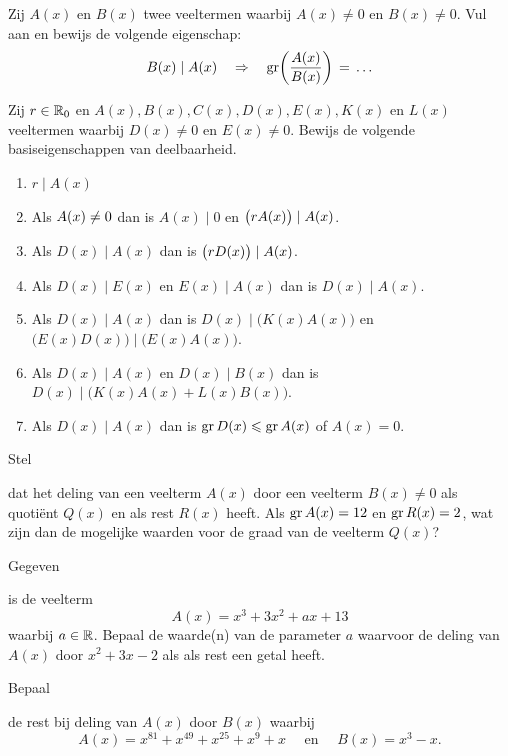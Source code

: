 \documentclass{ximera}
\begin{document}
\begin{Uitbreiding}
\begin{exercise} 
Zij $A(x)$ en $B(x)$ twee veeltermen waarbij $A(x) \neq 0$ en $B(x) \neq 0$. Vul aan en bewijs de volgende eigenschap:
\[
B(x) \mid A(x) \quad \Rightarrow \quad \operatorname{gr}\biggl(\frac{A(x)}{B(x)}\biggr) 
\, = \, \ldots
\]
\end{exercise} 

\begin{exercise} 
Zij $r \in \mathbb{R}_0$ en $A(x), B(x), C(x), D(x), E(x), K(x)$ en $L(x)$ veeltermen waarbij $D(x) \neq 0$ en $E(x) \neq 0$. Bewijs de volgende basiseigenschappen van deelbaarheid. 
\begin{enumerate}
\item
$r \mid A(x)$
\item
Als $\displaystyle A(x)  \neq 0$ dan is $A(x) \mid 0$ en $\displaystyle \bigl(rA(x)\bigr) \mid A(x)$.
\item
Als $D(x) \mid A(x)$ dan is $\displaystyle \bigl(rD(x)\bigr) \mid A(x)$.
\item
Als $D(x) \mid E(x)$ en $E(x) \mid A(x)$ dan is $D(x) \mid A(x)$. 
\item
Als $D(x) \mid A(x)$ dan is $D(x) \mid \bigl(K(x)A(x)\bigr)$ en $\bigl(E(x)D(x)\bigr) \mid \bigl(E(x)A(x)\bigr)$.
\item
Als $D(x) \mid A(x)$ en $D(x) \mid B(x)$ dan is $D(x) \mid \bigl(K(x)A(x)+L(x)B(x)\bigr)$.
\item
Als $D(x) \mid A(x)$ dan is $\operatorname{gr} D(x) \leqslant \operatorname{gr} A(x)$ of $A(x) = 0$.
\end{enumerate}
\end{exercise} 
\end{Uitbreiding}

\begin{exercise} 
\hypertarget{oef2.17}{Stel} dat het deling van een veelterm $A(x)$ door een veelterm $B(x) \neq 0$ als quoti\"ent $Q(x)$ en als rest $R(x)$ heeft. Als $\operatorname{gr} A(x) = 12$ en $\operatorname{gr} R(x) = 2$, wat zijn dan de mogelijke waarden voor de graad van de veelterm $Q(x)$?
\end{exercise} 

\begin{exercise} 
\hypertarget{oef2.18}{Gegeven} is de veelterm
\[
A(x) = x^3+3x^2+ax+13
\]
waarbij $a \in \mathbb{R}$. Bepaal de waarde(n) van de parameter $a$ waarvoor de deling van $A(x)$ door $x^2+3x-2$ als als rest een getal heeft. 
\end{exercise} 

\begin{exercise} 
\hypertarget{oef2.19}{Bepaal} de rest bij deling van $A(x)$ door $B(x)$ waarbij
\[
A(x) = x^{81} + x^{49} + x^{25} + x^{9} + x \quad \text{ en } \quad B(x) = x^3-x.
\]
\end{exercise} 
\end{document}
